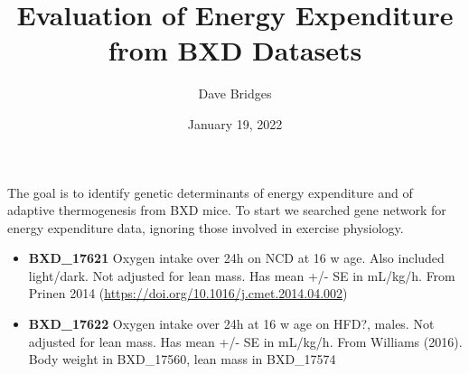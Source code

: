 \documentclass[]{article}
\title{Evaluation of Energy Expenditure from BXD Datasets}
\author{Dave Bridges}
\date{January 19, 2022}
\providecommand{\tightlist}{%
  \setlength{\itemsep}{0pt}\setlength{\parskip}{0pt}}
\begin{document}
\maketitle

{
\setcounter{tocdepth}{2}
\tableofcontents
}
The goal is to identify genetic determinants of energy expenditure and
of adaptive thermogenesis from BXD mice. To start we searched gene
network for energy expenditure data, ignoring those involved in exercise
physiology.

\begin{itemize}
\tightlist
\item
  \textbf{BXD\_17621} Oxygen intake over 24h on NCD at 16 w age. Also
  included light/dark. Not adjusted for lean mass. Has mean +/- SE in
  mL/kg/h. From Prinen 2014
  (\url{https://doi.org/10.1016/j.cmet.2014.04.002})
\item
  \textbf{BXD\_17622} Oxygen intake over 24h at 16 w age on HFD?, males.
  Not adjusted for lean mass. Has mean +/- SE in mL/kg/h. From Williams
  (2016). Body weight in BXD\_17560, lean mass in BXD\_17574
\end{itemize}
\end{document}
